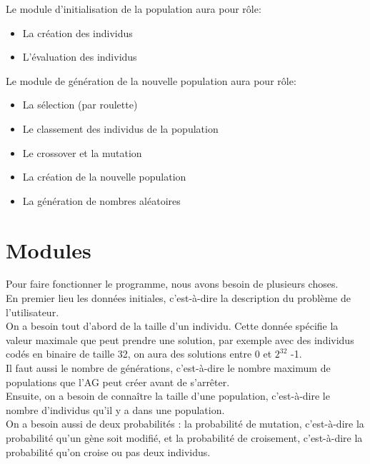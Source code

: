 \documentclass[a4paper,11pt]{article}
\begin{document}
		Le module d’initialisation de la population aura pour rôle:
		\begin{itemize}
				\item La création des individus
				\item L’évaluation des individus\\
		\end{itemize}
		Le module de génération de la nouvelle population aura pour rôle:
		\begin{itemize}
				\item La sélection (par roulette)
				\item Le classement des individus de la population
				\item Le crossover et la mutation
				\item La création de la nouvelle population
				\item La génération de nombres aléatoires\\
		\end{itemize}
		
	\section{Modules}
		Pour faire fonctionner le programme, nous avons besoin de plusieurs choses.\\
		
		En premier lieu les données initiales, c'est-à-dire la description du problème de l'utilisateur.\\
		On a besoin tout d’abord de la taille d’un individu. 
		Cette donnée spécifie la valeur maximale que peut prendre une solution, par exemple avec des individus codés en binaire de taille 32, on aura des solutions entre 0 et $2^{32}$ -1.\\
		Il faut aussi le nombre de générations, c’est-à-dire le nombre maximum de populations que l’AG peut créer avant de s’arrêter.\\

		Ensuite, on a besoin de connaître la taille d’une population, c’est-à-dire le nombre d’individus qu’il y a dans une population.\\
		On a besoin aussi de deux probabilités : la probabilité de mutation, c’est-à-dire la probabilité qu’un gène soit modifié, et la probabilité de croisement, c’est-à-dire la probabilité qu’on croise ou pas deux individus. 
		
\end{document}
